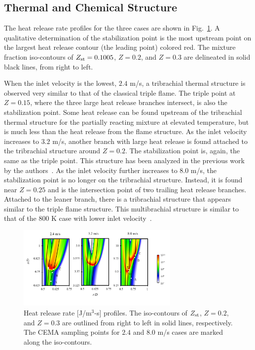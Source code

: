 \documentclass{wssci}
\begin{document}
\subsection{Thermal and Chemical Structure}  
The heat release rate profiles for the three cases are shown in Fig.~\ref{fig:HRR_V}.  A qualitative determination of the stabilization point is the most upstream point on the largest heat release contour (the leading point) colored red.  The mixture fraction iso-contours of $Z_{\rm st} = 0.1005$, $Z = 0.2$, and $Z = 0.3$ are delineated in solid black lines, from right to left.

When the inlet velocity is the lowest, $2.4$ m/s, a tribrachial thermal structure is observed very similar to that of the classical triple flame.  The triple point at $Z = 0.15$, where the three large heat release branches intersect, is also the stabilization point.  Some heat release can be found upstream of the tribrachial thermal structure for the partially reacting mixture at elevated temperature, but is much less than the heat release from the flame structure.  As the inlet velocity increases to $3.2$ m/s, another branch with large heat release is found attached to the tribrachial structure around $Z = 0.2$.  The stabilization point is, again, the same as the triple point.  This structure has been analyzed in the previous work by the authors~\cite{deng15}.  As the inlet velocity further increases to $8.0$ m/s, the stabilization point is no longer on the tribrachial structure.  Instead, it is found near $Z = 0.25$ and is the intersection point of two trailing heat release branches.  Attached to the leaner branch, there is a tribrachial structure that appears similar to the triple flame structure.  This multibrachial structure is similar to that of the $800$ K case with lower inlet velocity~\cite{deng15}.

\begin{figure}[t]
  \centering
  \scriptsize
  \vspace{-0.1in}
  \includegraphics[width=0.7\textwidth]{HRR_V.png}
  \normalsize
  \vspace{-0.4in}
  \caption{Heat release rate [J/m$^3$-s] profiles.  The iso-contours of $Z_{\rm st}$, $Z = 0.2$, and $Z = 0.3$ are outlined from right to left in solid lines, respectively.  The CEMA sampling points for $2.4$ and $8.0$ m/s cases are marked along the iso-contours.}
  \label{fig:HRR_V}
\end{figure}
\end{document}
